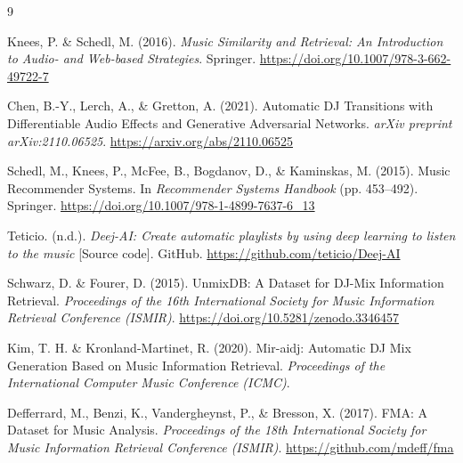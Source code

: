 \documentclass[10pt]{article}
\begin{document}
\begin{thebibliography}{9}

Knees, P. \& Schedl, M. (2016). \textit{Music Similarity and Retrieval: An Introduction to Audio- and Web-based Strategies}. Springer. \url{https://doi.org/10.1007/978-3-662-49722-7}

Chen, B.-Y., Lerch, A., \& Gretton, A. (2021). Automatic DJ Transitions with Differentiable Audio Effects and Generative Adversarial Networks. \textit{arXiv preprint arXiv:2110.06525}. \url{https://arxiv.org/abs/2110.06525}

Schedl, M., Knees, P., McFee, B., Bogdanov, D., \& Kaminskas, M. (2015). Music Recommender Systems. In \textit{Recommender Systems Handbook} (pp. 453--492). Springer. \url{https://doi.org/10.1007/978-1-4899-7637-6_13}

Teticio. (n.d.). \textit{Deej-AI: Create automatic playlists by using deep learning to listen to the music} [Source code]. GitHub. \url{https://github.com/teticio/Deej-AI}

Schwarz, D. \& Fourer, D. (2015). UnmixDB: A Dataset for DJ-Mix Information Retrieval. \textit{Proceedings of the 16th International Society for Music Information Retrieval Conference (ISMIR)}. \url{https://doi.org/10.5281/zenodo.3346457}

Kim, T. H. \& Kronland-Martinet, R. (2020). Mir-aidj: Automatic DJ Mix Generation Based on Music Information Retrieval. \textit{Proceedings of the International Computer Music Conference (ICMC)}.

Defferrard, M., Benzi, K., Vandergheynst, P., \& Bresson, X. (2017). FMA: A Dataset for Music Analysis. \textit{Proceedings of the 18th International Society for Music Information Retrieval Conference (ISMIR)}. \url{https://github.com/mdeff/fma}

\end{thebibliography}
\end{document}
